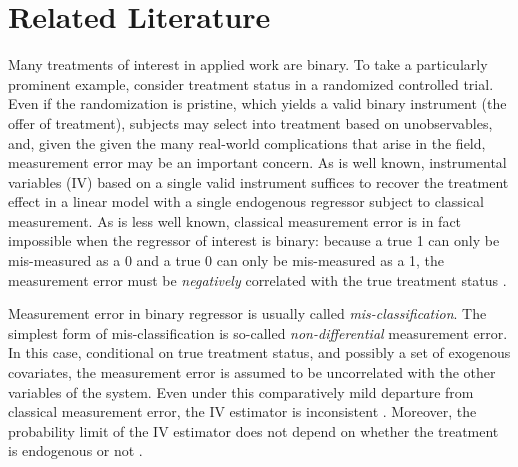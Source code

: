 \section{Related Literature}
Many treatments of interest in applied work are binary.
To take a particularly prominent example, consider treatment status in a randomized controlled trial.
Even if the randomization is pristine, which yields a valid binary instrument (the offer of treatment), subjects may select into treatment based on unobservables, and, given the given the many real-world complications that arise in the field, measurement error may be an important concern.
As is well known, instrumental variables (IV) based on a single valid instrument suffices to recover the treatment effect in a linear model with a single endogenous regressor subject to classical measurement.
As is less well known, classical measurement error is in fact impossible when the regressor of interest is binary: because a true 1 can only be mis-measured as a 0 and a true 0 can only be mis-measured as a 1, the measurement error must be \emph{negatively} correlated with the true treatment status \citep{Aigner,Bollinger}. 

Measurement error in binary regressor is usually called \emph{mis-classification}.
The simplest form of mis-classification is so-called \emph{non-differential} measurement error.
In this case, conditional on true treatment status, and possibly a set of exogenous covariates, the measurement error is assumed to be uncorrelated with the other variables of the system.
Even under this comparatively mild departure from classical measurement error, the IV estimator is inconsistent \citep{BBS, KRS}. 
Moreover, the probability limit of the IV estimator does not depend on whether the treatment is endogenous or not \citep{FL}.

